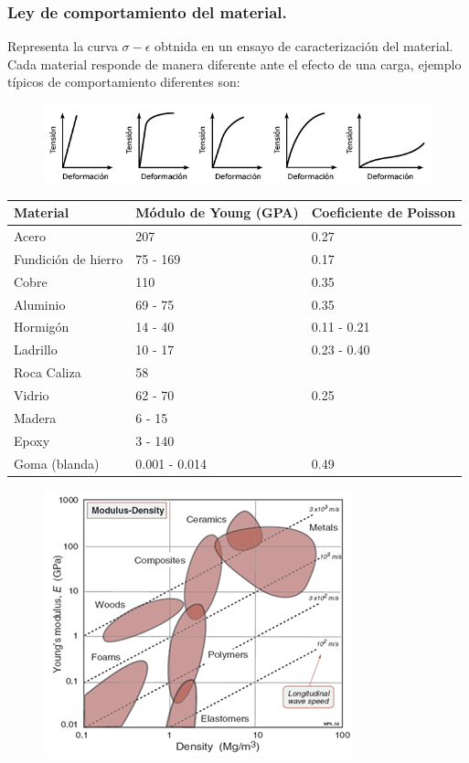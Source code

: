 \subsubsection{Ley de comportamiento del material.}
Representa la curva $\sigma - \epsilon$ obtnida en un ensayo de caracterización del material. Cada material responde de manera diferente ante el efecto de una carga, ejemplo típicos de comportamiento diferentes son:

\begin{figure}[H]
    \centering
    \includegraphics[width = 0.5 \textwidth]{Imagenes/Ley de comportamiento del material.png}
\end{figure}

\begin{table}[H]
    \centering
    \begin{tabular}{| l | p{2cm} | p{2cm} |}
        \hline
        \rowcolor{lightgray} Material & Módulo de Young (GPA) & Coeficiente de Poisson \\
        \hline
        Acero & 207 & 0.27 \\
        Fundición de hierro & 75 - 169 & 0.17 \\
        Cobre & 110 & 0.35 \\
        Aluminio & 69 - 75 & 0.35 \\
        Hormigón & 14 - 40 & 0.11 - 0.21 \\
        Ladrillo & 10 - 17 & 0.23 - 0.40 \\
        Roca Caliza & 58 & \\
        Vidrio & 62 - 70 & 0.25 \\
        Madera & 6 - 15 & \\
        Epoxy & 3 - 140 & \\
        Goma (blanda) & 0.001 - 0.014 & 0.49 \\
        \hline
    \end{tabular}
\end{table}

\begin{figure}[H]
    \centering
    \includegraphics[width = 0.5 \textwidth]{Imagenes/Grafica Modulo de Young - Densidad.png}
\end{figure}

